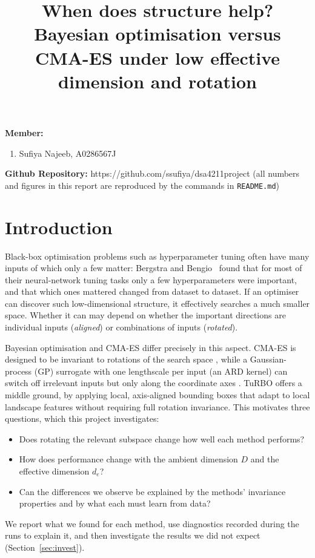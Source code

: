 \documentclass[12pt]{article}
\begin{document}
\title{When does structure help? Bayesian optimisation versus CMA-ES under low effective dimension and rotation}
\date{}
\maketitle
{\bf Member:}
\begin{enumerate}\setlength{\itemsep}{0pt}
\item {Sufiya Najeeb, A0286567J}
\end{enumerate}

{\bf Github Repository:} https://github.com/ssufiya/dsa4211project (all numbers and figures in this report
are reproduced by the commands in \texttt{README.md})

\section{Introduction}
Black-box optimisation problems such as hyperparameter tuning often have many inputs of which only
a few matter: Bergstra and Bengio~\cite{bergstra2012random} found that for most of their neural-network tuning tasks
only a few hyperparameters were important, and that which ones mattered changed from dataset to
dataset. If an optimiser can discover such low-dimensional structure, it effectively searches a
much smaller space. Whether it can may depend on whether the important directions are individual
inputs (\emph{aligned}) or combinations of inputs (\emph{rotated}).

Bayesian optimisation and CMA-ES differ precisely in this aspect. CMA-ES is designed to be invariant
to rotations of the search space \cite{hansen2016cma}, while a Gaussian-process (GP) surrogate with
one lengthscale per input (an ARD kernel) can switch off irrelevant inputs but only along the
coordinate axes \cite{rasmussen2006gp}. TuRBO \cite{eriksson2019turbo} offers a middle ground, by applying local, axis-aligned bounding boxes that adapt to local landscape features without requiring full rotation invariance. This motivates three questions, which this project investigates: 

\begin{itemize}
  \item[\textbf{Q1}] Does rotating the relevant subspace change how well each method performs?
  \item[\textbf{Q2}] How does performance change with the ambient dimension $D$ and the effective
  dimension $d_e$?
  \item[\textbf{Q3}] Can the differences we observe be explained by the methods' invariance
  properties and by what each must learn from data?
\end{itemize}
We report what we found for each method, use diagnostics recorded during the runs to explain it, and
then investigate the results we did not expect (Section~\ref{sec:invest}).
\end{document}

